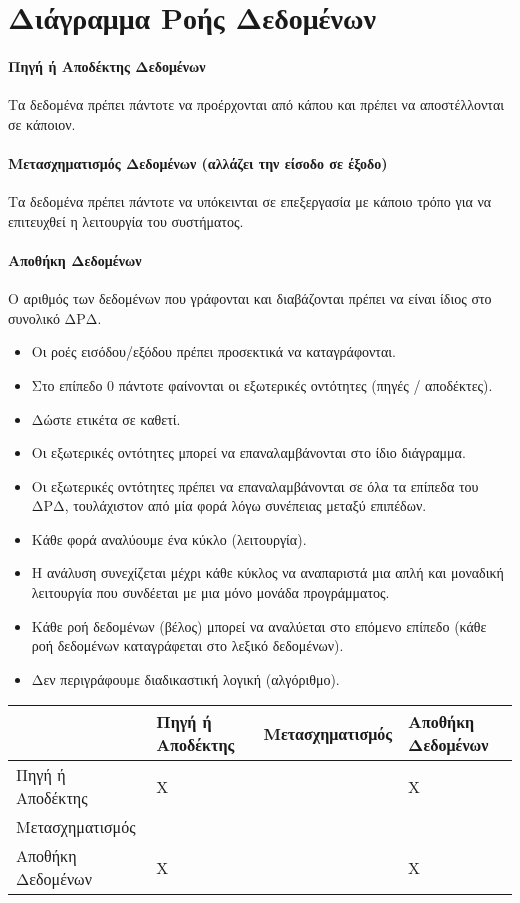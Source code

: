 \pagebreak
\section{Διάγραμμα Ροής Δεδομένων}

\paragraph{Πηγή ή Αποδέκτης Δεδομένων}
Τα δεδομένα πρέπει πάντοτε να προέρχονται από κάπου και πρέπει να αποστέλλονται σε κάποιον.

\paragraph{Μετασχηματισμός Δεδομένων (αλλάζει την είσοδο σε έξοδο)}
Τα δεδομένα πρέπει πάντοτε να υπόκεινται σε επεξεργασία με
κάποιο τρόπο για να επιτευχθεί η λειτουργία του συστήματος.

\paragraph{Αποθήκη Δεδομένων}
Ο αριθμός των δεδομένων που γράφονται και διαβάζονται πρέπει να είναι ίδιος
στο συνολικό ΔΡΔ.

\begin{itemize}
	\item	Οι ροές εισόδου/εξόδου πρέπει προσεκτικά να καταγράφονται.
	\item	Στο επίπεδο 0 πάντοτε φαίνονται οι εξωτερικές οντότητες (πηγές / αποδέκτες).
	\item	Δώστε ετικέτα σε καθετί.
	\item	Οι εξωτερικές οντότητες μπορεί να επαναλαμβάνονται στο ίδιο διάγραμμα.
	\item	Οι εξωτερικές οντότητες  πρέπει να επαναλαμβάνονται σε όλα τα επίπεδα του ΔΡΔ,
		τουλάχιστον από μία φορά λόγω συνέπειας μεταξύ επιπέδων.
	\item	Κάθε φορά αναλύουμε ένα κύκλο (λειτουργία).
	\item	Η ανάλυση συνεχίζεται μέχρι κάθε κύκλος να αναπαριστά μια απλή και μοναδική λειτουργία 
		που συνδέεται με μια μόνο μονάδα προγράμματος.
	\item	Κάθε ροή δεδομένων (βέλος) μπορεί να αναλύεται στο επόμενο επίπεδο 
		(κάθε ροή δεδομένων καταγράφεται στο λεξικό δεδομένων).
	\item	Δεν περιγράφουμε διαδικαστική λογική (αλγόριθμο).
\end{itemize}

\begin{tabularx}{0.9\textwidth}{|X|X|X|X|}
	\hline
	{} & {Πηγή ή Αποδέκτης} & {Μετασχηματισμός} & {Αποθήκη Δεδομένων} \\
	\hline
	{Πηγή ή Αποδέκτης} & {X} & {\checkmark} & {X} \\
	\hline
	{Μετασχηματισμός} & {\checkmark} & {\checkmark} & {\checkmark} \\
	\hline
	{Αποθήκη Δεδομένων} & {X} & {\checkmark} & {X} \\
	\hline
\end{tabularx}


